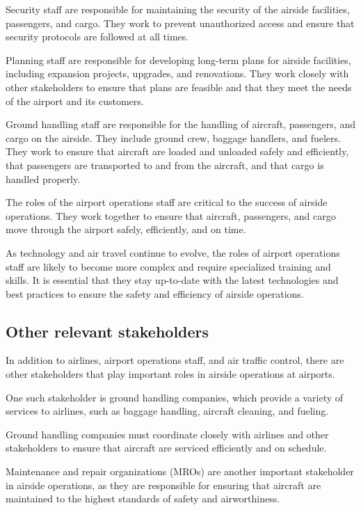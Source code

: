     Security staff are responsible for maintaining the security of the airside facilities, passengers, and cargo. They work to prevent unauthorized access and ensure that security protocols are followed at all times.

    Planning staff are responsible for developing long-term plans for airside facilities, including expansion projects, upgrades, and renovations. They work closely with other stakeholders to ensure that plans are feasible and that they meet the needs of the airport and its customers.

    Ground handling staff are responsible for the handling of aircraft, passengers, and cargo on the airside. They include ground crew, baggage handlers, and fuelers. They work to ensure that aircraft are loaded and unloaded safely and efficiently, that passengers are transported to and from the aircraft, and that cargo is handled properly.

    The roles of the airport operations staff are critical to the success of airside operations. They work together to ensure that aircraft, passengers, and cargo move through the airport safely, efficiently, and on time.

    As technology and air travel continue to evolve, the roles of airport operations staff are likely to become more complex and require specialized training and skills. It is essential that they stay up-to-date with the latest technologies and best practices to ensure the safety and efficiency of airside operations.
    
    \subsection{Other relevant stakeholders}

    In addition to airlines, airport operations staff, and air traffic control, there are other stakeholders that play important roles in airside operations at airports.
    
    One such stakeholder is ground handling companies, which provide a variety of services to airlines, such as baggage handling, aircraft cleaning, and fueling.
    
    Ground handling companies must coordinate closely with airlines and other stakeholders to ensure that aircraft are serviced efficiently and on schedule.
    
    Maintenance and repair organizations (MROs) are another important stakeholder in airside operations, as they are responsible for ensuring that aircraft are maintained to the highest standards of safety and airworthiness.
    
